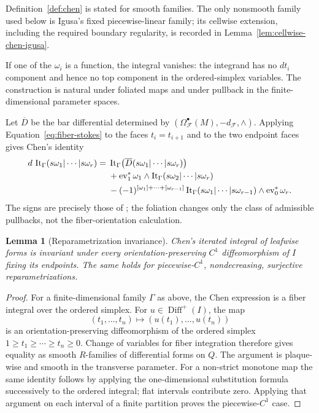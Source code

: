 \documentclass[12pt]{amsart}
\newtheorem{lem}[thm]{Lemma}
\theoremstyle{definition}
\theoremstyle{remark}
\numberwithin{equation}{section}
\newcommand{\CF}{{\mathcal F}}
\newcommand{\1}{{\mathbb{1}}}
\newcommand{\ev}{\operatorname{ev}}
\begin{document}
Definition~\ref{def:chen} is stated for smooth families.  The only
nonsmooth family used below is Igusa's fixed piecewise-linear family;
its cellwise extension, including the required boundary regularity, is
recorded in Lemma~\ref{lem:cellwise-chen-igusa}.

If one of the $\omega_i$ is a function, the integral vanishes: the
integrand has no $dt_i$ component and hence no top component in the
ordered-simplex variables.  The construction is natural under
foliated maps and under pullback in the finite-dimensional parameter
spaces.

Let $\overline D$ be the bar differential determined by
$(\Omega^\bullet_{\CF}(M),-d_{\CF},\wedge)$.  Applying
Equation~\eqref{eq:fiber-stokes} to the faces $t_i=t_{i+1}$ and to the
two endpoint faces gives Chen's identity
\begin{align}
 d\,\operatorname{It}_{\Gamma}
 (s\omega_1|\cdots|s\omega_r)
 ={}&
 \operatorname{It}_{\Gamma}
 \bigl(\overline D(s\omega_1|\cdots|s\omega_r)\bigr)
 \notag\\
 &+\ev_1^*\omega_1\wedge
 \operatorname{It}_{\Gamma}(s\omega_2|\cdots|s\omega_r)
 \notag\\
 &-(-1)^{[\omega_1]+\cdots+[\omega_{r-1}]}
 \operatorname{It}_{\Gamma}
 (s\omega_1|\cdots|s\omega_{r-1})
 \wedge\ev_0^*\omega_r.
 \label{eq:chen-stokes}
\end{align}
The signs are precisely those of \cite[Theorem 3.10]{AS12}; the
foliation changes only the class of admissible pullbacks, not the
fiber-orientation calculation.

\begin{lem}[Reparametrization invariance]\label{lem:reparam}
Chen's iterated integral of leafwise forms is invariant under every
orientation-preserving $C^1$ diffeomorphism of $I$ fixing its
endpoints.  The same holds for piecewise-$C^1$, nondecreasing,
surjective reparametrizations.
\end{lem}

\begin{proof}
For a finite-dimensional family $\Gamma$ as above, the Chen expression
is a fiber integral over the ordered simplex.  For
$u\in\operatorname{Diff}^+(I)$, the map
\[
 (t_1,\ldots,t_n)\longmapsto
 (u(t_1),\ldots,u(t_n))
\]
is an orientation-preserving diffeomorphism of the ordered simplex
$1\geq t_1\geq\cdots\geq t_n\geq0$.  Change of variables for fiber
integration therefore gives equality as smooth $R$-families of
differential forms on $Q$.
The argument is plaque-wise and smooth in the transverse parameter.
For a non-strict monotone map the same identity follows by applying the
one-dimensional substitution formula successively to the ordered
integral; flat intervals contribute zero.  Applying that argument on
each interval of a finite partition proves the piecewise-$C^1$ case.
\end{proof}
\end{document}

